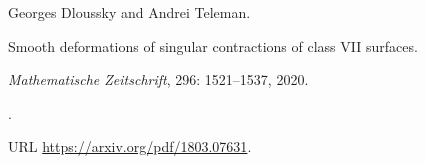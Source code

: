 Georges Dloussky and Andrei Teleman.

\newblock Smooth deformations of singular contractions of class {VII} surfaces.

\newblock \emph{Mathematische Zeitschrift}, 296: 1521--1537, 2020.

\newblock {}.

\newblock URL \url{https://arxiv.org/pdf/1803.07631}.
